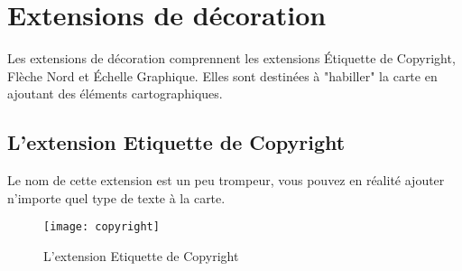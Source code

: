 
\section{Extensions de décoration}


Les extensions de décoration comprennent les extensions Étiquette de Copyright, 
Flèche Nord et Échelle Graphique. Elles sont destinées à "habiller" la carte en
ajoutant des éléments cartographiques.

\subsection{L'extension Etiquette de Copyright}

Le nom de cette extension est un peu trompeur, vous pouvez en réalité ajouter
n'importe quel type de texte à la carte.

\begin{figure}[ht]
   \begin{center}   
   \texttt{[image: copyright]}
   \caption{L'extension Etiquette de Copyright \nixcaption}\label{fig:copyright}
\end{center}  
\end{figure}

